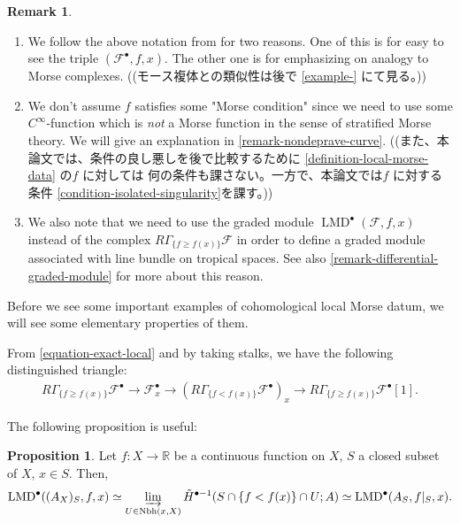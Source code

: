 \documentclass[a4paper,dvipdfmx,reqno,12pt]{amsart}
\theoremstyle{definition}
\newtheorem{proposition}[theorem]{Proposition}
\newtheorem{remark}[theorem]{Remark}
\newcommand{\mcal}[1]{\mathcal{#1}}%
\newcommand{\opn}[1]{\operatorname{#1}}
\numberwithin{equation}{section}
\begin{document}
\begin{remark}
\begin{enumerate}
\item We follow the above notation from 
\cite[p.271]{MR2031639} for two reasons.
One of this is for easy to see the triple 
$(\mcal{F}^{\bullet},f,x)$. 
The other one is for emphasizing on analogy to
Morse complexes.
((モース複体との類似性は後で \cref{example-} にて見る。))
\item We don't assume $f$ satisfies some 
"Morse condition" since
 we need to use some $C^{\infty}$-function
which is \emph{not} a Morse function in the sense of 
stratified Morse theory. 
We will give an explanation in 
\cref{remark-nondeprave-curve}.
((また、本論文では、条件の良し悪しを後で比較するために
\cref{definition-local-morse-data} の$f$ に対しては
何の条件も課さない。一方で、本論文では$f$ に対する
条件 \cref{condition-isolated-singularity}を課す。))
\item We also note that we need to use 
the graded module $\opn{LMD}^{\bullet}(\mcal{F},f,x)$ instead of 
the complex $R\Gamma_{\{f\geq f(x)\}}\mathcal{F}$ in order to define
a graded module associated with line bundle on tropical
spaces. See also \cref{remark-differential-graded-module} for more about 
this reason.
\end{enumerate}
\end{remark}

Before we see some important examples of cohomological
local Morse datum, we will see some elementary
properties of them.

From \cref{equation-exact-local} and by taking stalks,
we have the following distinguished triangle:
\begin{align}
R\Gamma_{\{f\geq f(x)\}}\mathcal{F}^{\bullet} \to 
\mathcal{F}_x^{\bullet}\to 
(R\Gamma_{\{f<f(x)\}}\mathcal{F}^{\bullet})_x\to 
R\Gamma_{\{f\geq f(x)\}}\mathcal{F}^{\bullet}[1].
\end{align}



The following proposition is useful:

\begin{proposition} \label{prop-local-morse-data}
Let $f\colon X\to \mathbb{R}$ be a continuous function
on $X$, $S$ a closed subset
of $X$, $x\in S$. Then,
\begin{align} 
\opn{LMD}^{\bullet}((A_{X})_S,f,x
) \simeq \varinjlim_{U\in\opn{Nbh}(x,X)} 
\tilde{H}^{\bullet-1}(S\cap \{f<f(x)\}\cap U;A) 
\simeq \opn{LMD}^{\bullet}(A_S,f|_S,x).
\end{align}

\end{proposition}
\end{document}
